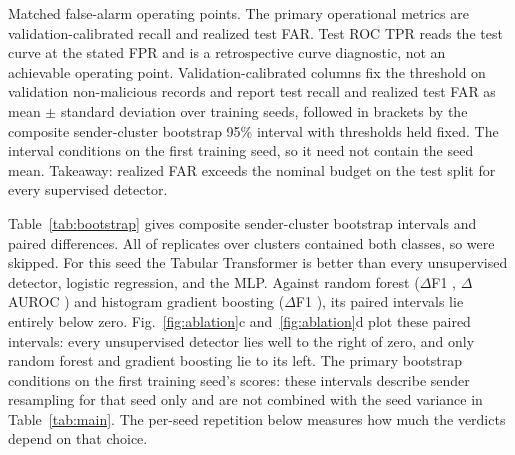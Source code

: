 \documentclass[preprint,12pt,numafflabel]{elsarticle}
\begin{document}
\begin{table}
\centering
\caption{Matched false-alarm operating points. The primary operational metrics are validation-calibrated recall and realized test FAR. Test ROC TPR reads the test curve at the stated FPR and is a retrospective curve diagnostic, not an achievable operating point. Validation-calibrated columns fix the threshold on validation non-malicious records and report test recall and realized test FAR as mean $\pm$ standard deviation over \ResSeeds{} training seeds, followed in brackets by the composite sender-cluster bootstrap 95\% interval with thresholds held fixed. The interval conditions on the first training seed, so it need not contain the seed mean. Takeaway: realized FAR exceeds the nominal budget on the test split for every supervised detector.}
\label{tab:operating}
{\scriptsize\setlength{\tabcolsep}{3pt}
\begin{adjustbox}{max width=\textwidth}

\end{adjustbox}}
\end{table}

Table~\ref{tab:bootstrap} gives composite sender-cluster bootstrap intervals and paired differences. All \ResBootValid{} of \ResBootRequested{} replicates over \ResBootClusters{} clusters contained both classes, so \ResBootSkipped{} were skipped. For this seed the Tabular Transformer is better than every unsupervised detector, logistic regression, and the MLP. Against random forest ($\Delta$F1 \ResRandomForestDeltaFOneCI, $\Delta$AUROC \ResRandomForestDeltaAUROCCI) and histogram gradient boosting ($\Delta$F1 \ResHGBDeltaFOneCI), its paired intervals lie entirely below zero. Fig.~\ref{fig:ablation}c and~\ref{fig:ablation}d plot these paired intervals: every unsupervised detector lies well to the right of zero, and only random forest and gradient boosting lie to its left. The primary bootstrap conditions on the first training seed's scores: these intervals describe sender resampling for that seed only and are not combined with the seed variance in Table~\ref{tab:main}. The per-seed repetition below measures how much the verdicts depend on that choice.
\end{document}
